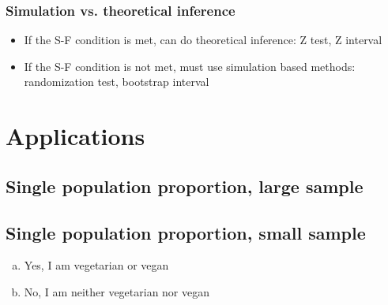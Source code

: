 \documentclass[slidestop,compress,mathserif,12pt,t,professionalfonts,xcolor=table]{beamer}
\begin{document}

\begin{frame}
\frametitle{Simulation vs. theoretical inference}

\begin{itemize}

\item If the S-F condition is met, can do theoretical inference: Z test, Z interval

\item If the S-F condition is not met, must use simulation based methods: randomization test, bootstrap interval

\end{itemize}

\end{frame}

\section{Applications}


\subsection{Single population proportion, large sample}


\begin{frame}

\vfill


\vfill

\end{frame}


\subsection{Single population proportion, small sample}


\begin{frame}


\begin{enumerate}[(a)]
\item Yes, I am vegetarian or vegan
\item No, I am neither vegetarian nor vegan
\end{enumerate}

\end{frame}
\end{document}
